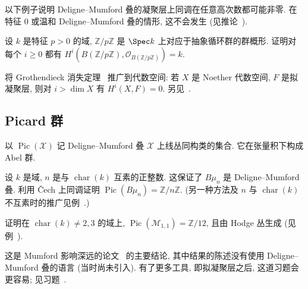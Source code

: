 以下例子说明 Deligne--Mumford 叠的凝聚层上同调在任意高次数都可能非零. 在特征 $0$ 或温和 Deligne--Mumford 叠的情形, 这不会发生 (见推论~).
\begin{exercise}\label{src:5.1.47}
设 $k$ 是特征 $p>0$ 的域, $\mathbb Z/p\mathbb Z$ 是 $\Spec k$ 上对应于抽象循环群的群概形. 证明对每个 $i\geq0$ 都有 $H^i(B(\mathbb Z/p\mathbb Z),\mathcal O_{B(\mathbb Z/p\mathbb Z)})=k$.
\end{exercise}
\begin{exercise}[困难]\label{src:5.1.48}
将 Grothendieck 消失定理~\cite[定理 III.2.7]{Har77} 推广到代数空间: 若 $X$ 是 Noether 代数空间, $F$ 是拟凝聚层, 则对 $i>\dim X$ 有 $H^i(X,F)=0$. 另见~\cite[Tag 0A4Q]{SP}.
\end{exercise}

\subsection{Picard 群}\label{src:5.1.7-subsection}
以 $\operatorname{Pic}(\mathcal X)$ 记 Deligne--Mumford 叠 $\mathcal X$ 上线丛同构类的集合. 它在张量积下构成 Abel 群.
\begin{exercise}\label{src:5.1.49}
设 $k$ 是域, $n$ 是与 $\operatorname{char}(k)$ 互素的正整数. 这保证了 $B\mu_n$ 是 Deligne--Mumford 叠. 利用 Čech 上同调证明 $\operatorname{Pic}(B\mu_n)=\mathbb Z/n\mathbb Z$. (另一种方法及 $n$ 与 $\operatorname{char}(k)$ 不互素时的推广见例~.)
\end{exercise}
\begin{exercise}[困难]\label{src:5.1.50}
证明在 $\operatorname{char}(k)\neq2,3$ 的域上, $\operatorname{Pic}(\mathcal M_{1,1})=\mathbb Z/12$, 且由 Hodge 丛生成 (见例~).
\end{exercise}
这是 Mumford 影响深远的论文~\cite{Mum65} 的主要结论, 其中结果的陈述没有使用 Deligne--Mumford 叠的语言 (当时尚未引入). 有了更多工具, 即拟凝聚层之后, 这道习题会更容易; 见习题~.

